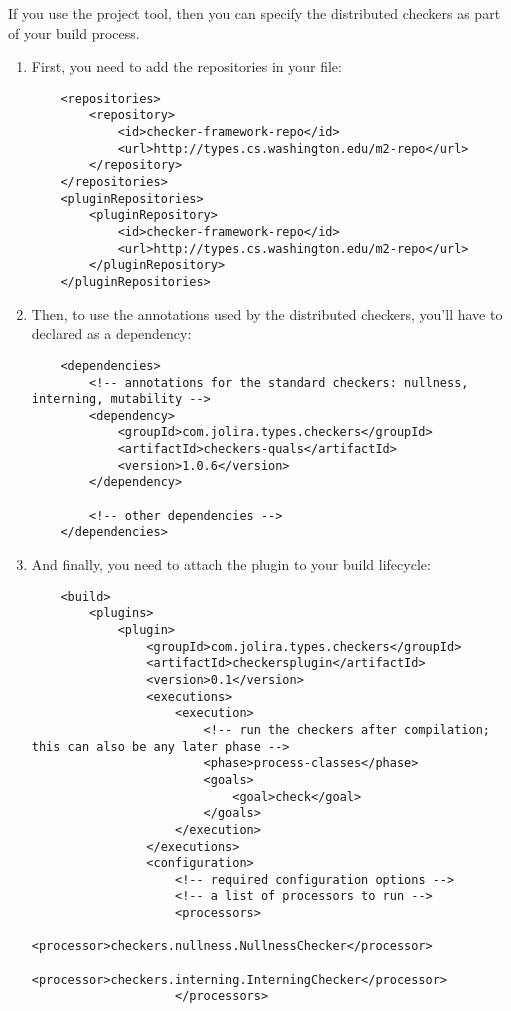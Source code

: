 If you use the  project tool,
then you can specify the distributed checkers as part of your build
process.

\begin{enumerate}

\item First, you need to add the repositories in your  file:

\begin{Verbatim}
    <repositories>
        <repository>
            <id>checker-framework-repo</id>
            <url>http://types.cs.washington.edu/m2-repo</url>
        </repository>
    </repositories>
    <pluginRepositories>
        <pluginRepository>
            <id>checker-framework-repo</id>
            <url>http://types.cs.washington.edu/m2-repo</url>
        </pluginRepository>
    </pluginRepositories>
\end{Verbatim}

\item Then, to use the annotations used by the distributed checkers, you'll
have to declared as a dependency:

\begin{Verbatim}
    <dependencies>
        <!-- annotations for the standard checkers: nullness, interning, mutability -->
        <dependency>
            <groupId>com.jolira.types.checkers</groupId>
            <artifactId>checkers-quals</artifactId>
            <version>1.0.6</version>
        </dependency>

        <!-- other dependencies -->
    </dependencies>
\end{Verbatim}

\item And finally, you need to attach the plugin to your build lifecycle:

\begin{Verbatim}
    <build>
        <plugins>
            <plugin>
                <groupId>com.jolira.types.checkers</groupId>
                <artifactId>checkersplugin</artifactId>
                <version>0.1</version>
                <executions>
                    <execution>
                        <!-- run the checkers after compilation; this can also be any later phase -->
                        <phase>process-classes</phase>
                        <goals>
                            <goal>check</goal>
                        </goals>
                    </execution>
                </executions>
                <configuration>
                    <!-- required configuration options -->
                    <!-- a list of processors to run -->
                    <processors>
                        <processor>checkers.nullness.NullnessChecker</processor>
                        <processor>checkers.interning.InterningChecker</processor>
                    </processors>



\end{Verbatim}
\end{enumerate}
